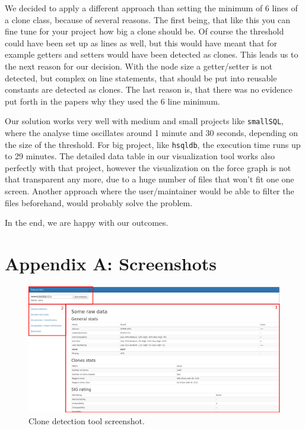 \documentclass{uva-inf-article}
\begin{document}
We decided to apply a different approach than setting the minimum of 6 lines of a clone class, because of several reasons. The first being, that like this you can fine tune for your project how big a clone should be. Of course the threshold could have been set up as lines as well, but this would have meant that for example getters and setters would have been detected as clones. This leads us to the next reason for our decision. With the node size a getter/setter is not detected, but complex on line statements, that should be put into reusable constants are detected as clones. The last reason is, that there was no evidence put forth in the papers why they used the 6 line minimum.

Our solution works very well with medium and small projects like \texttt{smallSQL}, where the analyse time oscillates around 1 minute and 30 seconds, depending on the size of the threshold. For big project, like \texttt{hsqldb}, the execution time runs up to 29 minutes. The detailed data table in our visualization tool works also perfectly with that project, however the visualization on the force graph is not that transparent any more, due to a huge number of files that won't fit one one screen. Another approach where the user/maintainer would be able to filter the files beforehand, would probably solve the problem. 

In the end, we are happy with our outcomes. 


\printbibliography


\section{Appendix A: Screenshots}\label{appendix:a}

\begin{figure}[!htb]
	\includegraphics[width=\textwidth]{visualization1}
	\centering
	\caption{Clone detection tool screenshot.}
	\label{screenshot1}
\end{figure}
\end{document}
